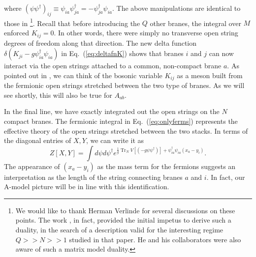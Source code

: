 \documentclass[english]{article}
\DeclareMathOperator{\Tr}{Tr}
\begin{document}
where $(\psi\psi^{\dagger})_{ij} \equiv \psi_{ia} \psi^{\dagger}_{ja} = - \psi^{\dagger}_{ja} \psi_{ia} $. The above manipulations are identical to those in \cite{goel2021string}\footnote{We would like to thank Herman Verlinde for several discussions on these points. The work \cite{goel2021string}, in fact, provided the initial impetus to derive such a duality, in the search of a description valid for the interesting regime $Q>>N>>1$ studied in that paper. He and his collaborators were also aware of such a matrix model duality.}. Recall that before introducing the $Q$ other branes, the integral over $M$ enforced $K_{ij}=0$. In other words, there were simply no transverse open string degrees of freedom along that direction. The new delta function $\delta(K_{ji}-g \psi^{\dagger}_{ia}\psi_{ia})$ in Eq.~(\ref{eq:deltafnK}) shows that branes $i$ and $j$ can now interact via the open strings attached to a common, non-compact brane $a$. As pointed out in \cite{exact}, we can think of the bosonic variable $K_{ij}$ as a meson built from the fermionic open strings stretched between the two type of branes. As we will see shortly, this will also be true for $A_{ab}$. 

In the final line, we have exactly integrated out the open strings on the $N$ compact branes. The fermionic integral in Eq.~(\ref{eq:onlyferms}) represents the effective theory of the open strings stretched between the two stacks. In terms of the diagonal entries of $X, Y$, we can write it as
\begin{equation}
    Z[X,Y]=\int d\psi d\psi^{\dagger} e^{\frac{1}{g} \Tr_{N} V\left[(-g\psi \psi^{\dagger}) \right]+\psi^{\dagger}_{ia}\psi_{ia}(x_a-y_i)}.
\end{equation}
The appearance of $(x_a-y_i)$ as the mass term for the fermions suggests an interpretation as the length of the string connecting branes $a$ and $i$. In fact, our A-model picture will be in line with this identification.
\end{document}
